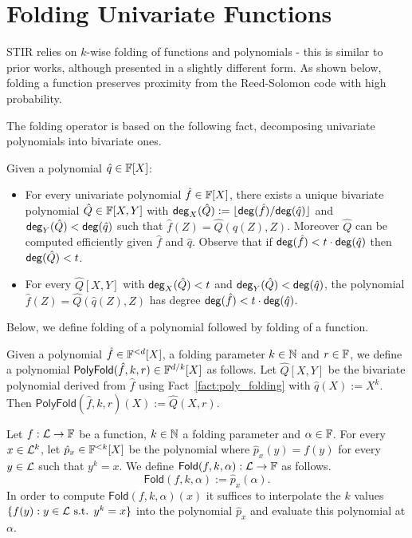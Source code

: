 \section{Folding Univariate Functions}
STIR relies on $k$-wise folding of functions and polynomials - this is similar to prior works, although presented in a slightly different form. As shown below, folding a function preserves proximity from the Reed-Solomon code with high probability. 

The folding operator is based on the following fact, decomposing univariate polynomials into bivariate ones.

\begin{fact}\label{fact:poly_folding} %
Given a polynomial $\hat{q}\in\mathbb{F}[X]$:
\begin{itemize}
    \item For every univariate polynomial $\hat{f}\in\mathbb{F}[X]$, there exists a unique bivariate polynomial $\hat{Q}\in\mathbb{F}[X,Y]$ with $\mathsf{deg}_X(\hat{Q}):=\lfloor{\mathsf{deg}(\hat{f})}/{\mathsf{deg}(\hat{q})}\rfloor$ and $\mathsf{deg}_Y(\hat{Q})<\mathsf{deg}(\hat{q})$ such that $\hat{f}(Z)=\hat{Q}(\hat{q}(Z),Z)$. Moreover $\hat{Q}$ can be computed efficiently given $\hat{f}$ and $\hat{q}$. Observe that if $\mathsf{deg}(\hat{f})<t\cdot\mathsf{deg}(\hat{q})$ then $\mathsf{deg}(\hat{Q})<t$.
    \item For every $\hat{Q}[X,Y]$ with $\mathsf{deg}_X(\hat{Q})<t$ and $\mathsf{deg}_Y(\hat{Q})<\mathsf{deg}(\hat{q})$, the polynomial $\hat{f}(Z)=\hat{Q}(\hat{q}(Z),Z)$ has degree $\mathsf{deg}(\hat{f})<t\cdot\mathsf{deg}(\hat{q})$.
\end{itemize}
\end{fact}

Below, we define folding of a polynomial followed by folding of a function.
\begin{definition}
    Given a polynomial $\hat{f}\in\mathbb{F}^{<d}[X]$, a folding parameter $k\in\mathbb{N}$ and $r\in\mathbb{F}$, we define a polynomial $\mathsf{PolyFold}(\hat{f},k,r)\in\mathbb{F}^{d/k}[X]$ as follows. Let $\hat{Q}[X,Y]$ be the bivariate polynomial derived from $\hat{f}$ using Fact~\ref{fact:poly_folding} with $\hat{q}(X):=X^k$. Then $\mathsf{PolyFold}(\hat{f},k,r)(X):=\hat{Q}(X,r)$.
\end{definition}

\begin{definition}
Let $f:\mathcal{L}\rightarrow\mathbb{F}$ be a function, $k\in\mathbb{N}$ a folding parameter and $\alpha\in\mathbb{F}$. For every $x\in{\mathcal{L}}^k$, let $\hat{p}_x\in\mathbb{F}^{<k}[X]$ be the polynomial where $\hat{p}_x(y)=f(y)$ for every $y\in{\mathcal{L}}$ such that $y^k=x$. We define $\mathsf{Fold}(f,k,\alpha):\mathcal{L}\rightarrow\mathbb{F}$ as follows.
\[
    \mathsf{Fold}(f,k,\alpha):=\hat{p}_x(\alpha).
\]
In order to compute $\mathsf{Fold}(f,k,\alpha)(x)$ it suffices to interpolate the $k$ values $\{f(y):y\in\mathcal{L}\text{ s.t. }y^k=x\}$ into the polynomial $\hat{p}_x$ and evaluate this polynomial at $\alpha$.
\end{definition}

